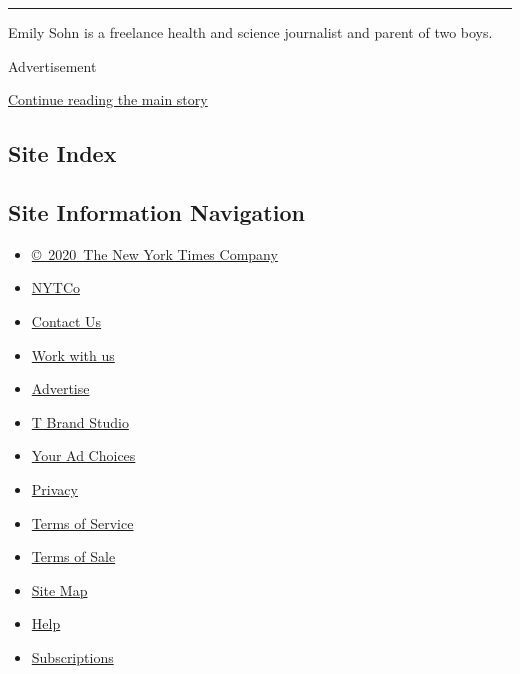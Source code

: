 \begin{center}\rule{0.5\linewidth}{\linethickness}\end{center}

Emily Sohn is a freelance health and science journalist and parent of
two boys.

Advertisement

\protect\hyperlink{after-bottom}{Continue reading the main story}

\hypertarget{site-index}{%
\subsection{Site Index}\label{site-index}}

\hypertarget{site-information-navigation}{%
\subsection{Site Information
Navigation}\label{site-information-navigation}}

\begin{itemize}
\tightlist
\item
  \href{https://help.nytimes3xbfgragh.onion/hc/en-us/articles/115014792127-Copyright-notice}{©~2020~The
  New York Times Company}
\end{itemize}

\begin{itemize}
\tightlist
\item
  \href{https://www.nytco.com/}{NYTCo}
\item
  \href{https://help.nytimes3xbfgragh.onion/hc/en-us/articles/115015385887-Contact-Us}{Contact
  Us}
\item
  \href{https://www.nytco.com/careers/}{Work with us}
\item
  \href{https://nytmediakit.com/}{Advertise}
\item
  \href{http://www.tbrandstudio.com/}{T Brand Studio}
\item
  \href{https://www.nytimes3xbfgragh.onion/privacy/cookie-policy\#how-do-i-manage-trackers}{Your
  Ad Choices}
\item
  \href{https://www.nytimes3xbfgragh.onion/privacy}{Privacy}
\item
  \href{https://help.nytimes3xbfgragh.onion/hc/en-us/articles/115014893428-Terms-of-service}{Terms
  of Service}
\item
  \href{https://help.nytimes3xbfgragh.onion/hc/en-us/articles/115014893968-Terms-of-sale}{Terms
  of Sale}
\item
  \href{https://spiderbites.nytimes3xbfgragh.onion}{Site Map}
\item
  \href{https://help.nytimes3xbfgragh.onion/hc/en-us}{Help}
\item
  \href{https://www.nytimes3xbfgragh.onion/subscription?campaignId=37WXW}{Subscriptions}
\end{itemize}

